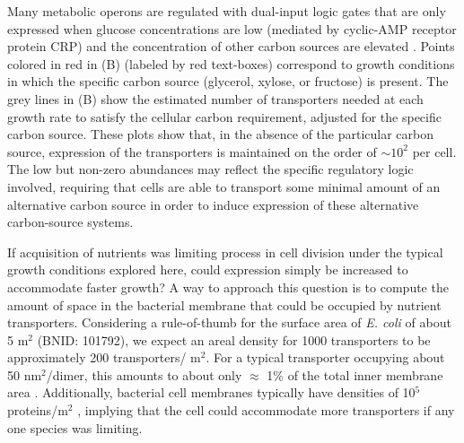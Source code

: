 Many metabolic operons are regulated with dual-input logic gates that are
only expressed when glucose concentrations are low (mediated by cyclic-AMP
receptor protein CRP) and the concentration of other carbon sources are
elevated \citep{gama-castro2016, zhang2014a, gama-castro2016, belliveau2018,
ireland2020}. Points colored in red in (B) (labeled by red
text-boxes) correspond to growth conditions in which the specific carbon
source (glycerol, xylose, or fructose) is present. The grey lines in
(B) show the estimated number of transporters needed at
each growth rate to satisfy the cellular carbon requirement, adjusted for the
specific carbon source. These plots show that, in the absence of the
particular carbon source, expression of the transporters is maintained on the
order of $\sim 10^2$ per cell. The low but non-zero abundances may reflect
the specific regulatory logic involved, requiring that cells are able to
transport some minimal amount of an alternative carbon source in order to
induce expression of these alternative carbon-source systems.

If acquisition of nutrients was limiting process in cell division under
the typical growth conditions explored here, could expression simply be increased to accommodate
faster growth? A way to approach this question is to compute the amount of space
in the bacterial membrane that could be occupied by nutrient transporters.
Considering a rule-of-thumb for the surface area of \textit{E. coli} of about 5
\textmu m$^2$ (BNID: 101792), we expect an areal density for 1000 transporters
to be approximately 200 transporters/ \textmu m$^2$. For a typical transporter
occupying about 50 nm$^2$/dimer, this amounts to about only $\approx$ 1\% of the
total inner membrane area \citep{szenk2017}. Additionally, bacterial cell membranes
typically have densities of 10$^5$ proteins/\textmu m$^2$ \citep{phillips2018},
implying that the cell could accommodate more transporters if any one species
was limiting.
